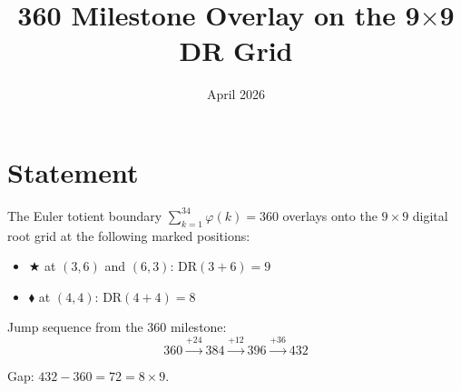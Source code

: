 \documentclass{article}
\title{360 Milestone Overlay on the 9$\times$9 DR Grid}
\date{April 2026}
\begin{document}
\maketitle

\section{Statement}

The Euler totient boundary $\sum_{k=1}^{34}\varphi(k) = 360$ overlays onto the $9\times9$ digital root grid at the following marked positions:

\begin{itemize}
\item $\bigstar$ at $(3,6)$ and $(6,3)$: $\mathrm{DR}(3+6)=9$
\item $\blacklozenge$ at $(4,4)$: $\mathrm{DR}(4+4)=8$
\end{itemize}

Jump sequence from the 360 milestone:
\[
360 \xrightarrow{+24} 384 \xrightarrow{+12} 396 \xrightarrow{+36} 432
\]

Gap: $432 - 360 = 72 = 8 \times 9$.
\end{document}
